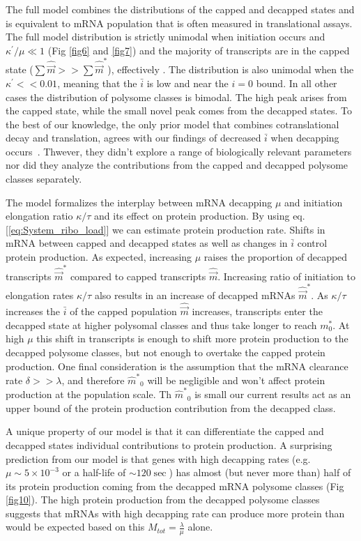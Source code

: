 \documentclass[10pt,letterpaper]{article}
\newcommand{\kappaprime}{\ensuremath{\kappa^{\prime}}\xspace}
\newcommand{\mhat}{\ensuremath{\hat{m}}\xspace}
\newcommand{\mhatstar}{\ensuremath{\mhat^{*}}\xspace}
\newcommand{\mvec}{\ensuremath{\vec{m}}\xspace}
\newcommand{\mvechat}{\ensuremath{\hat{\mvec}}\xspace}
\newcommand{\mvechatstar}{\ensuremath{\mvechat^*}\xspace}
\newcommand{\MRL}{\ensuremath{\bar{i}}\xspace}
\begin{document}
The full model combines the distributions of the capped and decapped states and is equivalent to mRNA population that is often measured in translational assays.
The full model distribution is strictly unimodal when initiation occurs and $\kappaprime/\mu \ll 1$ (Fig \ref{fig6} and \ref{fig7}) and the majority of transcripts are in the capped state ($\sum \mvechat >> \sum \mvechatstar$), effectively .
The distribution is also unimodal when the $\kappaprime << 0.01$, meaning that the \MRL is low and near the $i=0$ bound. 
In all other cases the distribution of polysome classes is bimodal.
The high peak arises from the capped state, while the small novel  peak comes from the decapped states. 
To the best of our knowledge, the only prior model that combines cotranslational decay and translation, agrees with our findings of decreased \MRL when decapping occurs~\cite{RN22}.
Thwever, they didn't explore a range of biologically relevant parameters nor did they analyze the contributions from the capped and decapped polysome classes separately.

The model formalizes the interplay between mRNA decapping $\mu$ and initiation elongation ratio $\kappa/\tau$ and its effect on protein production.
By using eq.  [\ref{eq:System_ribo_load}] we can estimate protein production rate.
Shifts in mRNA between capped and decapped states as well as changes in \MRL control protein production.
As expected, increasing $\mu$ raises the proportion of decapped transcripts \mvechatstar compared to capped transcripts \mvechat.
Increasing ratio of initiation to elongation rates $\kappa/\tau$ also results in an increase of decapped mRNAs \mvechatstar.
As $\kappa/\tau$ increases the \MRL of the capped population \mvechat increases, transcripts enter the decapped state at higher polysomal classes and thus take longer to reach $m_0^*$.
At high $\mu$ this shift in transcripts is enough to shift more protein production to the decapped polysome classes, but not enough to overtake the capped protein production.
One final consideration is the assumption that the mRNA clearance rate $\delta >> \lambda$, and therefore $\mhatstar_0$ will be negligible and won't affect protein production at the population scale.
Th $\mhatstar_0$ is small our current results act as an upper bound of the protein production contribution from the decapped class. 


A unique property of our model is that it can differentiate the capped and decapped states individual contributions to protein production. 
A surprising prediction from our model is that genes with  high decapping rates (e.g. $\mu  \sim 5 \times 10^{-3}$ or a half-life of $\sim 120 \sec$) has almost (but never more than) half of its protein production coming from the decapped mRNA polysome classes (Fig \ref{fig10}).
The high protein production from the decapped polysome classes suggests that mRNAs with high decapping rate can produce more protein than would be expected based on this $M_{tot} = \frac{\lambda}{\mu}$ alone. 
\end{document}

